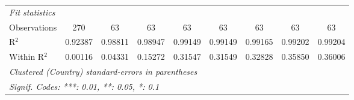 \begin{table}[htbp]
\begin{tabular}{lcccccccc}
      \emph{Fit statistics}\\
      Observations                                                             & 270      & 63       & 63             & 63              & 63              & 63              & 63                     & 63\\  
      R$^2$                                                                    & 0.92387  & 0.98811  & 0.98947        & 0.99149         & 0.99149         & 0.99165         & 0.99202                & 0.99204\\  
      Within R$^2$                                                             & 0.00116  & 0.04331  & 0.15272        & 0.31547         & 0.31549         & 0.32828         & 0.35850                & 0.36006\\  
      \midrule \midrule
      \multicolumn{9}{l}{\emph{Clustered (Country) standard-errors in parentheses}}\\
      \multicolumn{9}{l}{\emph{Signif. Codes: ***: 0.01, **: 0.05, *: 0.1}}\\
   \end{tabular}
\end{table}


